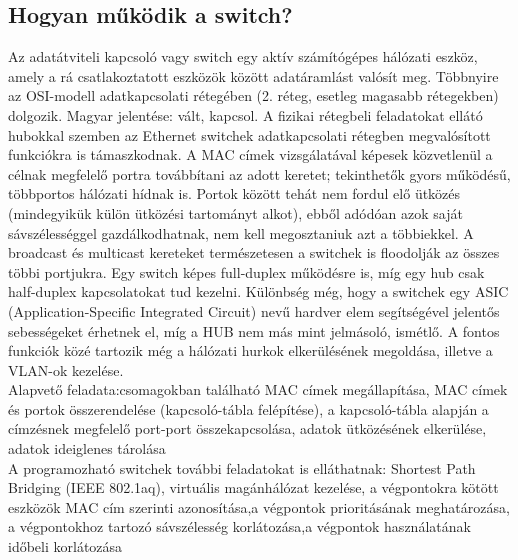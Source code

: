 \documentclass[12pt, a4paper]{article}
\begin{document}
\subsection{Hogyan működik a switch?}
Az adatátviteli kapcsoló vagy switch egy aktív számítógépes hálózati eszköz, amely a rá csatlakoztatott eszközök között adatáramlást valósít meg. Többnyire az OSI-modell adatkapcsolati rétegében (2. réteg, esetleg magasabb rétegekben) dolgozik. Magyar jelentése: vált, kapcsol. A fizikai rétegbeli feladatokat ellátó hubokkal szemben az Ethernet switchek adatkapcsolati rétegben megvalósított funkciókra is támaszkodnak. A MAC címek vizsgálatával képesek közvetlenül a célnak megfelelő portra továbbítani az adott keretet; tekinthetők gyors működésű, többportos hálózati hídnak is. Portok között tehát nem fordul elő ütközés (mindegyikük külön ütközési tartományt alkot), ebből adódóan azok saját sávszélességgel gazdálkodhatnak, nem kell megosztaniuk azt a többiekkel. A broadcast és multicast kereteket természetesen a switchek is floodolják az összes többi portjukra. Egy switch képes full-duplex működésre is, míg egy hub csak half-duplex kapcsolatokat tud kezelni. Különbség még, hogy a switchek egy ASIC (Application-Specific Integrated Circuit) nevű hardver elem segítségével jelentős sebességeket érhetnek el, míg a HUB nem más mint jelmásoló, ismétlő. A fontos funkciók közé tartozik még a hálózati hurkok elkerülésének megoldása, illetve a VLAN-ok kezelése.\\
Alapvető feladata:csomagokban található MAC címek megállapítása, MAC címek és portok összerendelése (kapcsoló-tábla felépítése), a kapcsoló-tábla alapján a címzésnek megfelelő port-port összekapcsolása, adatok ütközésének elkerülése, adatok ideiglenes tárolása
\\
A programozható switchek további feladatokat is elláthatnak:
Shortest Path Bridging (IEEE 802.1aq), virtuális magánhálózat kezelése, a végpontokra kötött eszközök MAC cím szerinti azonosítása,a végpontok prioritásának meghatározása, a végpontokhoz tartozó sávszélesség korlátozása,a végpontok használatának időbeli korlátozása
\end{document}
